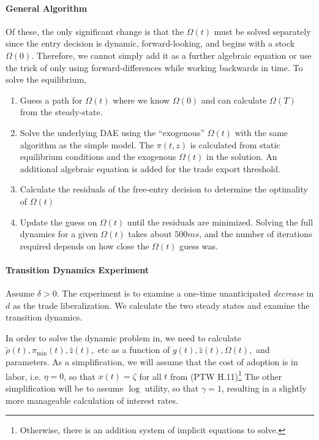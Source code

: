 \documentclass[11pt]{article}
\begin{document}
\paragraph{General Algorithm}
Of these, the only significant change is that the $\Omega(t)$ must be solved separately since the entry decision is dynamic, forward-looking, and begins with a stock $\Omega(0)$.  Therefore, we cannot simply add it as a further algebraic equation or use the trick of only using forward-differences while working backwards in time.  To solve the equilibrium,
\begin{enumerate}
	\item Guess a path for $\Omega(t)$ where we know $\Omega(0)$ and can calculate $\Omega(T)$ from the steady-state.
	\item Solve the underlying DAE using the ``exogenous'' $\Omega(t)$ with the same algorithm as the simple model.  The $\pi(t,z)$ is calculated from static equilibrium conditions and the exogenous $\Omega(t)$ in the solution.  An additional algebraic equation is added for the trade export threshold.
	\item Calculate the residuals of the free-entry decision to determine the optimality of $\Omega(t)$
	\item Update the guess on $\Omega(t)$ until the residuals are minimized. Solving the full dynamics for a given $\Omega(t)$ takes about $500ms$, and the number of iterations required depends on how close the $\Omega(t)$ guess was.
\end{enumerate}

\paragraph{Transition Dynamics Experiment}

Assume $\delta > 0$. The experiment is to examine a one-time unanticipated \textit{decrease} in $d$ as the trade liberalization.  We calculate the two steady states and examine the transition dynamics.

In order to solve the dynamic problem in, we need to calculate $\tilde{\rho}(t), \pi_{\min}(t),\hat{z}(t),$ etc  as a function of $g(t), \hat{z}(t), \Omega(t),$ and parameters.  As a simplification, we will assume that the cost of adoption is in labor, i.e. $\eta = 0$, so that $x(t) = \zeta$ for all $t$ from (PTW H.11)\footnote{Otherwise, there is an addition system of implicit equations to solve.}  The other simplification will be to assume $\log$ utility, so that $\gamma = 1$, resulting in a slightly more manageable calculation of interest rates.
\end{document}
